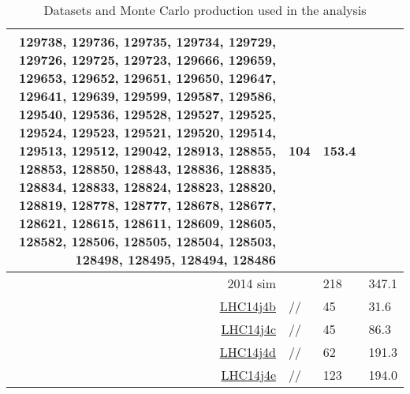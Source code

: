 \begin{table}[h]
\begin{tabularx}{\textwidth}{r|Xll}
                                129738, 129736, 129735, 129734, 129729, 129726, 129725, 129723, 129666, 129659,
                                129653, 129652, 129651, 129650, 129647, 129641, 129639, 129599, 129587, 129586,
                                129540, 129536, 129528, 129527, 129525, 129524, 129523, 129521, 129520, 129514,
                                129513, 129512, 129042, 128913, 128855, 128853, 128850, 128843, 128836, 128835,
                                128834, 128833, 128824, 128823, 128820, 128819, 128778, 128777, 128678, 128677,
                                128621, 128615, 128611, 128609, 128605, 128582, 128506, 128505, 128504, 128503,
                                128498, 128495, 128494, 128486				&104				&153.4								\\
\hline
\hline
2014	 sim		&				&218				&347.1							\\
\hline
\href{https://alimonitor.cern.ch/job_details.jsp}{LHC14j4b}		&//				&45				&31.6								\\
\href{https://alimonitor.cern.ch/job_details.jsp}{LHC14j4c}		&//				&45				&86.3								\\
\href{https://alimonitor.cern.ch/job_details.jsp}{LHC14j4d}		&//				&62				&191.3								\\
\href{https://alimonitor.cern.ch/job_details.jsp}{LHC14j4e}		&//				&123				&194.0								\\
\hline
\end{tabularx}
\caption{Datasets and Monte Carlo production used in the analysis}
\label{tab:datasetsummary}
\end{table}